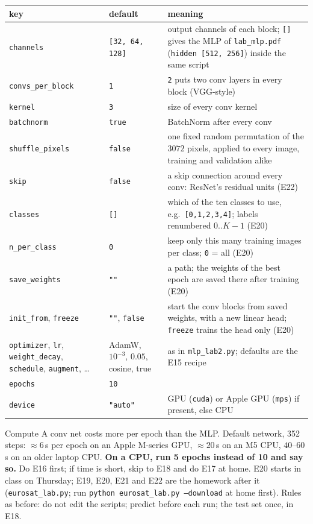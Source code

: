 \documentclass[11pt]{article}
\newcommand{\code}[1]{\texttt{#1}}
\begin{document}
\begin{center}\small
\begin{tabular}{@{}L{3.9cm}L{2.9cm}L{9.4cm}@{}}
\toprule
key & default & meaning \\
\midrule
\code{channels} & \code{[32, 64, 128]} & output channels of each block; \code{[]} gives the MLP of \code{lab\_mlp.pdf} (\code{hidden [512, 256]}) inside the same script \\
\code{convs\_per\_block} & \code{1} & \code{2} puts two conv layers in every block (VGG-style) \\
\code{kernel} & \code{3} & size of every conv kernel \\
\code{batchnorm} & \code{true} & BatchNorm after every conv \\
\code{shuffle\_pixels} & \code{false} & one fixed random permutation of the $3072$ pixels, applied to every image, training and validation alike \\
\code{skip} & \code{false} & a skip connection around every conv: ResNet's residual units (E22) \\
\code{classes} & \code{[]} & which of the ten classes to use, e.g.\ \code{[0,1,2,3,4]}; labels renumbered $0..K-1$ (E20) \\
\code{n\_per\_class} & \code{0} & keep only this many training images per class; \code{0} = all (E20) \\
\code{save\_weights} & \code{""} & a path; the weights of the best epoch are saved there after training (E20) \\
\code{init\_from}, \code{freeze} & \code{""}, \code{false} & start the conv blocks from saved weights, with a new linear head; \code{freeze} trains the head only (E20) \\
\code{optimizer}, \code{lr}, \code{weight\_decay}, \code{schedule}, \code{augment}, \dots & AdamW, $10^{-3}$, $0.05$, cosine, true & as in \code{mlp\_lab2.py}; defaults are the E15 recipe \\
\code{epochs} & \code{10} & \\
\code{device} & \code{"auto"} & GPU (\code{cuda}) or Apple GPU (\code{mps}) if present, else CPU \\
\bottomrule
\end{tabular}
\end{center}

\begin{rules}{Compute}
A conv net costs more per epoch than the MLP. Default network, 352 steps: $\approx6$\,s per epoch on an Apple M-series GPU, $\approx20$\,s on an M5 CPU, $40$--$60$\,s on an older laptop CPU. \textbf{On a CPU, run 5 epochs instead of 10 and say so.} Do E16 first; if time is short, skip to E18 and do E17 at home. E20 starts in class on Thursday; E19, E20, E21 and E22 are the homework after it (\code{eurosat\_lab.py}; run \code{python eurosat\_lab.py --download} at home first). Rules as before: do not edit the scripts; predict before each run; the test set once, in E18.
\end{rules}
\end{document}
